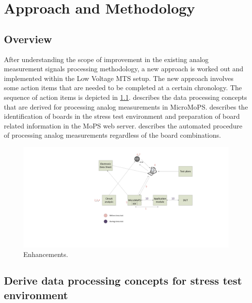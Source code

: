 \chapter{Approach and Methodology}
\section{Overview}
After understanding the scope of improvement in the existing analog measurement signals processing methodology,
a new approach is worked out and implemented within the Low Voltage MTS setup.
The new approach involves some action items that are needed to be completed at a certain chronology.
The sequence of action items is depicted in \cref{fig:flowchart}.
 describes the data processing concepts that are derived for processing analog measurements in MicroMoPS. 
 describes the identification of boards in the stress test environment and preparation of board related information in the MoPS web server.
 describes the automated procedure of processing analog measurements regardless of the board combinations.
\begin{figure}[hbt]
		\centering
		\includegraphics[trim=540 150 0 0, clip, width=195mm]{images/Approach_and_methodology.pdf}
		\caption{Enhancements.}
		\label{fig:flowchart}
\end{figure} 

\section{Derive data processing concepts for stress test environment}\label{sec:dataproc}

